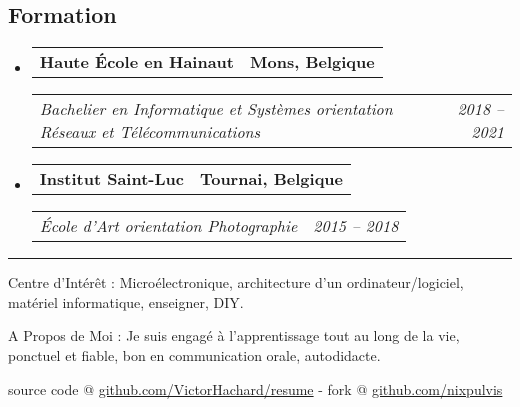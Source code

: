\documentclass[10pt,letterpaper]{article}
\makeatletter
\newenvironment{indentsection}[1]
{\begin{list}{}
  {\setlength{\leftmargin}{#1}} \item[]
}
{\end{list}}
\newcommand{\headerrow}[2]
{\begin{tabular*}{\linewidth}{l@{\extracolsep{\fill}}r}
  #1 &
  #2 \\
\end{tabular*}}
\makeatother
\begin{document}
\subsection*{Formation}
\begin{itemize}
  \parskip=0.1em

  \item
  \headerrow
    {\textbf{Haute École en Hainaut}}
    {\textbf{Mons, Belgique}}
  \headerrow
    {\emph{Bachelier en Informatique et Systèmes orientation Réseaux et
    Télécommunications}}
    {\emph{2018 -- 2021}}
  \item
  \headerrow
    {\textbf{Institut Saint-Luc}}
    {\textbf{Tournai, Belgique}}
  \headerrow
    {\emph{École d'Art orientation Photographie}}
    {\emph{2015 -- 2018}}
\end{itemize}

\hrule
\begin{indentsection}{\parindent}
\begin{description*}
\item[Centre d'Intérêt :]
  Microélectronique, architecture d'un ordinateur/logiciel, matériel
  informatique, enseigner, DIY.
\item[A Propos de Moi :]
  Je suis engagé à l'apprentissage tout au long de la vie, ponctuel et fiable,
  bon en communication orale, autodidacte.
\end{description*}
\end{indentsection}


\begin{center}
\footnotesize source code @
\href{http://www.github.com/VictorHachard/resume}
{github.com/VictorHachard/resume} - fork @
\href{http://www.github.com/nixpulvis}
{github.com/nixpulvis}
\end{center}
\end{document}
